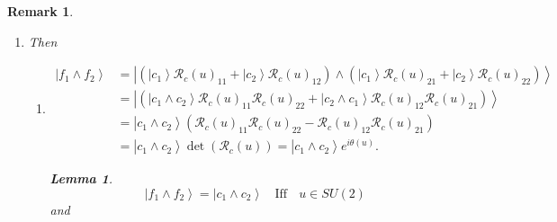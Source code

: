 \documentclass[aps,preprint]{revtex4}%
\newtheorem{lemma}[theorem]{Lemma}
\newtheorem{remark}[theorem]{Remark}
\begin{document}
\begin{remark}
\begin{enumerate}
\begin{enumerate}
\item
\begin{equation}
\operatorname*{Tr}\left(  \overset{}{\mathcal{R}_{c}\left(  \lambda\right)
}\right)  =0\Leftrightarrow\mathcal{R}_{c}\left(  \lambda\right)
_{11}=-\mathcal{R}_{c}\left(  \lambda\right)  _{22}%
\end{equation}

\end{enumerate}

\item Then

\begin{enumerate}
\item
\begin{align}
\left\vert f_{1}\wedge f_{2}\right\rangle  &  =\left\vert \left(
\overset{}{\left\vert c_{1}\right\rangle \mathcal{R}_{c}\left(  u\right)
_{11}+\left\vert c_{2}\right\rangle \mathcal{R}_{c}\left(  u\right)  _{12}%
}\right)  \wedge\left(  \overset{}{\left\vert c_{1}\right\rangle
\mathcal{R}_{c}\left(  u\right)  _{21}+\left\vert c_{2}\right\rangle
\mathcal{R}_{c}\left(  u\right)  _{22}}\right)  \right\rangle \\
&  =\left\vert \left(  \overset{}{\left\vert c_{1}\wedge c_{2}\right\rangle
\mathcal{R}_{c}\left(  u\right)  _{11}\mathcal{R}_{c}\left(  u\right)
_{22}+\left\vert c_{2}\wedge c_{1}\right\rangle \mathcal{R}_{c}\left(
u\right)  _{12}}\mathcal{R}_{c}\left(  u\right)  _{21}\right)  \right\rangle
\\
&  =\left\vert \overset{}{c_{1}\wedge c_{2}}\right\rangle \left(
\overset{}{\mathcal{R}_{c}\left(  u\right)  _{11}\mathcal{R}_{c}\left(
u\right)  _{22}-\mathcal{R}_{c}\left(  u\right)  _{12}\mathcal{R}_{c}\left(
u\right)  _{21}}\right)  \\
&  =\left\vert \overset{}{c_{1}\wedge c_{2}}\right\rangle \det\left(
\mathcal{R}_{c}\left(  u\right)  \right)  =\left\vert \overset{}{c_{1}\wedge
c_{2}}\right\rangle e^{i\theta\left(  u\right)  }.
\end{align}


\begin{lemma}%
\begin{equation}
\left\vert f_{1}\wedge f_{2}\right\rangle =\left\vert c_{1}\wedge
c_{2}\right\rangle \text{ }\operatorname*{Iff}\text{ }u\in SU\left(  2\right)
\end{equation}
and
\end{lemma}
\end{enumerate}


\end{enumerate}
\end{remark}
\end{document}

